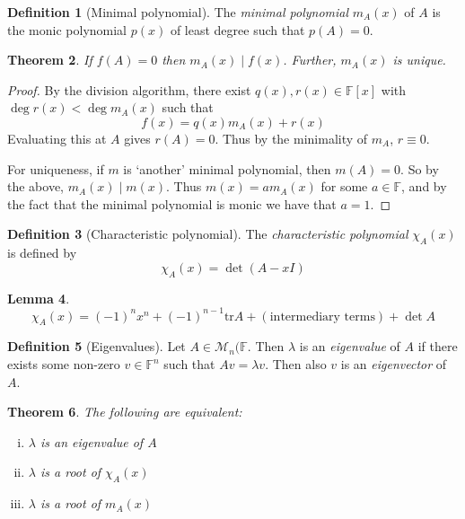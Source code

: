 \documentclass[10pt,fleqn]{article}
\newcommand{\tr}{\mathrm{tr}}
\newcommand{\field}{\mathbb{F}}
\newcommand{\mat}{\mathcal{M}}
\theoremstyle{definition} \newtheorem{defn}{Definition}[section]
\theoremstyle{plain}      \newtheorem{thm}[defn]{Theorem}
\theoremstyle{plain}      \newtheorem{prop}[defn]{Proposition}
\theoremstyle{plain}      \newtheorem{lem}[defn]{Lemma}
\theoremstyle{plain}      \newtheorem{cor}[defn]{Corollary}
\theoremstyle{plain}      \newtheorem{ad}[defn]{Addendum}
\theoremstyle{definition} \newtheorem{ex}[defn]{Example}
\theoremstyle{definition} \newtheorem{rem}[defn]{Remark}
\numberwithin{equation}{subsection}
\begin{document}
\begin{defn}[Minimal polynomial]
    The \emph{minimal polynomial} $m_A(x)$ of $A$ is the monic polynomial $p(x)$ of least degree such that $p(A)=0$.
\end{defn}

\begin{thm}
    If $f(A)=0$ then $m_A(x)\mid f(x)$.
    Further, $m_A(x)$ is unique.
\end{thm}

\begin{proof}
    By the division algorithm, there exist $q(x),r(x)\in\field[x]$ with $\deg r(x)<\deg m_A(x)$ such that
    \[
        f(x)=
        q(x)m_A(x)+r(x)
    \]
    Evaluating this at $A$ gives $r(A)=0$.
    Thus by the minimality of $m_A$, $r\equiv0$.

    For uniqueness, if $m$ is `another' minimal polynomial, then $m(A)=0$.
    So by the above, $m_A(x)\mid m(x)$.
    Thus $m(x)=am_A(x)$ for some $a\in\field$, and by the fact that the minimal polynomial is monic we have that $a=1$.
\end{proof}

\begin{defn}[Characteristic polynomial]
    The \emph{characteristic polynomial} $\chi_A(x)$ is defined by
    \[
        \chi_A(x)=
        \det(A-xI)
    \]
\end{defn}

\begin{lem}
    \[
        \chi_A(x)=
        (-1)^nx^n+(-1)^{n-1}\tr A+(\text{intermediary terms})+\det A
    \]
\end{lem}

\begin{defn}[Eigenvalues]
    Let $A\in\mat_n(\field$.
    Then $\lambda$ is an \emph{eigenvalue} of $A$ if there exists some non-zero $v\in\field^n$ such that $Av=\lambda v$.
    Then also $v$ is an \emph{eigenvector} of $A$.
\end{defn}

\begin{thm}
    The following are equivalent:
    \begin{enumerate}[(i)]
        \item $\lambda$ is an eigenvalue of $A$
        \item $\lambda$ is a root of $\chi_A(x)$
        \item $\lambda$ is a root of $m_A(x)$
    \end{enumerate}
\end{thm}
\end{document}
